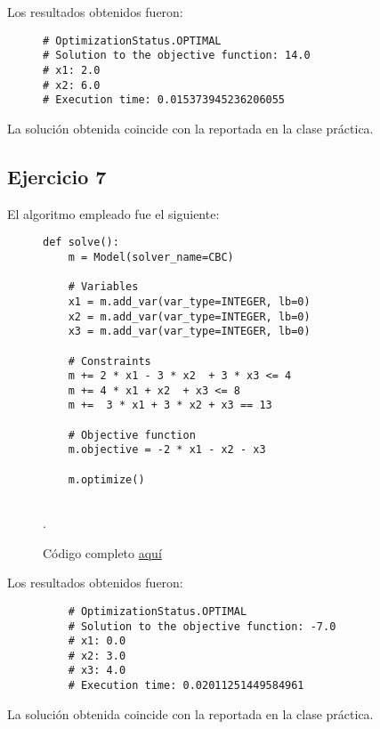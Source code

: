\documentclass[titlepage, 11pt]{scrartcl}
\begin{document}
Los resultados obtenidos fueron:
\begin{figure}[H]
	\begin{verbatim}
# OptimizationStatus.OPTIMAL
# Solution to the objective function: 14.0
# x1: 2.0
# x2: 6.0
# Execution time: 0.015373945236206055
	\end{verbatim}
\end{figure}
La solución obtenida coincide con la reportada en la clase práctica.

\subsection{Ejercicio 7}
El algoritmo empleado fue el siguiente:
\begin{figure}[H]
	\begin{verbatim}
def solve():
	m = Model(solver_name=CBC)
	
	# Variables
	x1 = m.add_var(var_type=INTEGER, lb=0)
	x2 = m.add_var(var_type=INTEGER, lb=0)
	x3 = m.add_var(var_type=INTEGER, lb=0)
	
	# Constraints
	m += 2 * x1 - 3 * x2  + 3 * x3 <= 4
	m += 4 * x1 + x2  + x3 <= 8
	m +=  3 * x1 + 3 * x2 + x3 == 13
	
	# Objective function
	m.objective = -2 * x1 - x2 - x3
	
	m.optimize()
	
	\end{verbatim}
	\caption{Código completo \href{ex6.py}{aquí}}.
\end{figure}

Los resultados obtenidos fueron:
\begin{figure}[H]
	\begin{verbatim}
	# OptimizationStatus.OPTIMAL
	# Solution to the objective function: -7.0
	# x1: 0.0
	# x2: 3.0
	# x3: 4.0
	# Execution time: 0.02011251449584961
	\end{verbatim}
\end{figure}
La solución obtenida coincide con la reportada en la clase práctica.
\end{document}
